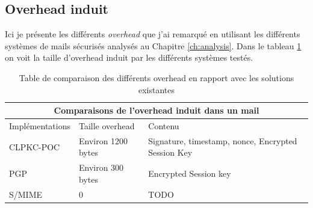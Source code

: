 \subsection{Overhead induit}
Ici je présente les différents \textit{overhead} que j'ai remarqué en utilisant les différents systèmes de mails sécurisés analysés au Chapitre \ref{ch:analysis}. Dans le tableau \ref{table:comparisonOverhead} on voit la taille d'overhead induit par les différents systèmes testés.
\begin{table}[h!]
	\centering
	\begin{tabular}{ |p{3cm}||p{5cm}|p{6cm}| }
		\hline
		\multicolumn{3}{|c|}{Comparaisons de l'overhead induit dans un mail} \\
		\hline
		Implémentations & Taille overhead & Contenu\\
		\hline
		CLPKC-POC   & Environ 1200 bytes & Signature, timestamp, nonce, Encrypted Session Key\\
		PGP & Environ 300 bytes & Encrypted Session key\\
		S/MIME & 0 & TODO\\
		\hline
	\end{tabular}
	\caption{Table de comparaison des différents overhead en rapport avec les solutions existantes }
	\label{table:comparisonOverhead}
\end{table}